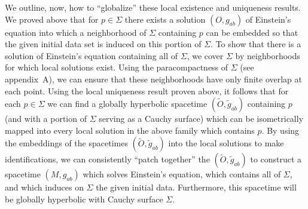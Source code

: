 We outline, now, how to ``globalize'' these local existence and uniqueness results.
We proved above that for \(p\in\Sigma\) there exists a solution \((O,g_{ab})\) of
Einstein's equation into which a neighborhood of \(\Sigma\) containing \(p\) can be
embedded so that the given initial data set is induced on this portion of \(\Sigma\).
To show that there is a solution of Einstein's equation containing all of \(\Sigma\), we
cover \(\Sigma\) by neighborhoods for which local solutions exist. Using the
paracompactness of \(\Sigma\) (see appendix~A), we can ensure that these
neighborhoods have only finite overlap at each point. Using the local uniqueness result
proven above, it follows that for each \(p\in\Sigma\) we can find a globally hyperbolic
spacetime \((\widetilde O,\widetilde g_{ab})\) containing \(p\) (and with a portion of
\(\Sigma\) serving as a Cauchy surface) which can be isometrically mapped into every
local solution in the above family which contains \(p\). By using the embeddings of
the spacetimes \((\widetilde O,\widetilde g_{ab})\) into the local solutions to make
identifications, we can consistently ``patch together'' the
\((\widetilde O,\widetilde g_{ab})\) to construct a spacetime \((M,g_{ab})\) which
solves Einstein's equation, which contains all of \(\Sigma\), and which induces on
\(\Sigma\) the given initial data. Furthermore, this spacetime will be globally
hyperbolic with Cauchy surface \(\Sigma\).

